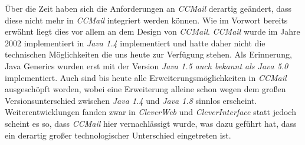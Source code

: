 Über die Zeit haben sich die Anforderungen an \emph{CCMail} derartig geändert, dass diese nicht mehr in \emph{CCMail} integriert werden können. Wie im Vorwort bereits erwähnt liegt dies vor allem an dem Design von \emph{CCMail}. \emph{CCMail} wurde im Jahre 2002 implementiert in \emph{Java 1.4} implementiert und hatte daher nicht die technischen Möglichkeiten die uns heute zur Verfügung stehen. Als Erinnerung, Java Generics wurden erst mit der Version \emph{Java 1.5 auch bekannt als Java 5.0} implementiert. Auch sind bis heute alle Erweiterungsmöglichkeiten in \emph{CCMail} ausgeschöpft worden, wobei eine Erweiterung alleine schon wegen dem großen Versionsunterschied zwischen \emph{Java 1.4} und \emph{Java 1.8} sinnlos erscheint. Weiterentwicklungen fanden zwar in \emph{CleverWeb} und \emph{CleverInterface} statt jedoch scheint es so, dass \emph{CCMail} hier vernachlässigt wurde, was dazu geführt hat, dass ein derartig großer technologischer Unterschied eingetreten ist. 